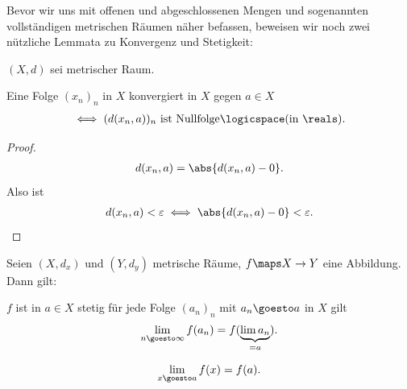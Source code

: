 Bevor wir uns mit offenen und abgeschlossenen Mengen und sogenannten vollständigen metrischen Räumen näher befassen, beweisen wir noch zwei nützliche Lemmata zu Konvergenz und Stetigkeit:

\begin{lemma}\label{konvergenz_abstand_ist_nullfolge}
    \( (X,d) \) sei metrischer Raum.

    Eine Folge \( (x_n)_n \) in \( X \) konvergiert in \( X \) gegen \( a\in X \)
    \begin{align*}
        \iff (d(x_n,a))_n \text{ ist Nullfolge}\logicspace(\text{in } \reals).
    \end{align*}
\end{lemma}
\begin{proof}
    \begin{align*}
        d(x_n,a)=\abs{d(x_n,a)-0}.
    \end{align*}
    Also ist
    \begin{align*}
        d(x_n,a)<\varepsilon\iff \abs{d(x_n,a)-0}<\varepsilon.
    \end{align*}
    
\end{proof}
\begin{lemma}\label{stetigkeit:folgenkonvergenzkriterium}
    Seien \( (X,d_x) \) und \( (Y, d_y) \) metrische Räume, \( f\maps X\to Y \) eine Abbildung. 
    Dann gilt:

    \( f \) ist in \( a\in X \) stetig \tiff für jede Folge \( (a_n)_n \) mit \( a_n\goesto a \) in \( X \) gilt
    \begin{align*}
        \lim\limits_{n \goesto \infty}  f(a_n)=f(\underbrace{\lim a_n}_{=a}).
    \end{align*} 
    \begin{notation*}
        \begin{align*}
            \lim\limits_{x \goesto a} f(x)=f(a).
        \end{align*}
    \end{notation*}
    
\end{lemma}
